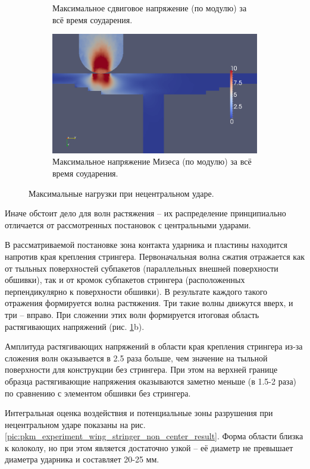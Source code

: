 \begin{figure}[h]
\begin{subfigure}[b]{0.5\textwidth}
\caption{Максимальное сдвиговое напряжение (по модулю) за всё время соударения.}
\end{subfigure}
\begin{subfigure}[b]{0.5\textwidth}
\centering
\includegraphics[width=\textwidth]{png/pkm-experiment/wing-stringer-non-center/mises.png}
\caption{Максимальное напряжение Мизеса (по модулю) за всё время соударения.}
\end{subfigure}
\caption{Максимальные нагрузки при нецентральном ударе.}
\label{pic:pkm_experiment_non_center}
\end{figure}

Иначе обстоит дело для волн растяжения -- их распределение принципиально отличается от рассмотренных постановок с центральными ударами.

В рассматриваемой постановке зона контакта ударника и пластины находится напротив края крепления стрингера. Первоначальная волна сжатия отражается как от тыльных поверхностей субпакетов (параллельных внешней поверхности обшивки), так и от кромок субпакетов стрингера (расположенных перпендикулярно к поверхности обшивки). В результате каждого такого отражения формируется волна растяжения. Три такие волны движутся вверх, и три -- вправо. При сложении этих волн формируется итоговая область растягивающих напряжений (рис. \ref{pic:pkm_experiment_non_center}b).

Амплитуда растягивающих напряжений в области края крепления стрингера из-за сложения волн оказывается в 2.5 раза больше, чем значение на тыльной поверхности для конструкции без стрингера. При этом на верхней границе образца растягивающие напряжения оказываются заметно меньше (в 1.5-2 раза) по сравнению с элементом обшивки без стрингера.

Интегральная оценка воздействия и потенциальные зоны разрушения при нецентральном ударе показаны на рис. \ref{pic:pkm_experiment_wing_stringer_non_center_result}. Форма области близка к колоколу, но при этом является достаточно узкой -- её диаметр не превышает диаметра ударника и составляет 20-25 мм.


